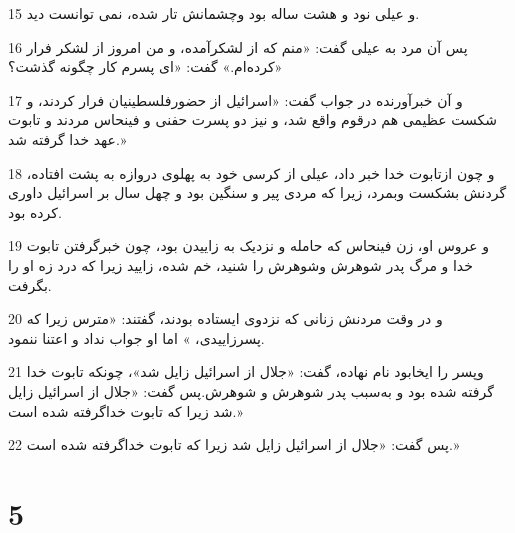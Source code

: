 \par 15 و عیلی نود و هشت ساله بود وچشمانش تار شده، نمی توانست دید.
\par 16 پس آن مرد به عیلی گفت: «منم که از لشکرآمده، و من امروز از لشکر فرار کرده‌ام.» گفت: «ای پسرم کار چگونه گذشت؟»
\par 17 و آن خبرآورنده در جواب گفت: «اسرائیل از حضورفلسطینیان فرار کردند، و شکست عظیمی هم درقوم واقع شد، و نیز دو پسرت حفنی و فینحاس مردند و تابوت عهد خدا گرفته شد.»
\par 18 و چون ازتابوت خدا خبر داد، عیلی از کرسی خود به پهلوی دروازه به پشت افتاده، گردنش بشکست وبمرد، زیرا که مردی پیر و سنگین بود و چهل سال بر اسرائیل داوری کرده بود.
\par 19 و عروس او، زن فینحاس که حامله و نزدیک به زاییدن بود، چون خبر‌گرفتن تابوت خدا و مرگ پدر شوهرش وشوهرش را شنید، خم شده، زایید زیرا که درد زه او را بگرفت.
\par 20 و در وقت مردنش زنانی که نزدوی ایستاده بودند، گفتند: «مترس زیرا که پسرزاییدی، » اما او جواب نداد و اعتنا ننمود.
\par 21 وپسر را ایخابود نام نهاده، گفت: «جلال از اسرائیل زایل شد»، چونکه تابوت خدا گرفته شده بود و به‌سبب پدر شوهرش و شوهرش.پس گفت: «جلال از اسرائیل زایل شد زیرا که تابوت خداگرفته شده است.»
\par 22 پس گفت: «جلال از اسرائیل زایل شد زیرا که تابوت خداگرفته شده است.»
 
\chapter{5}

